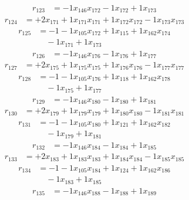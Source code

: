 \[\begin{aligned}
r_{123} &= - 1 x_{146} x_{172} - 1 x_{172} + 1 x_{173}
\end{aligned}\]
\[\begin{aligned}
r_{124} &= + 2 x_{171} + 1 x_{171} x_{171} + 1 x_{172} x_{172} - 1 x_{173} x_{173}
\end{aligned}\]
\[\begin{aligned}
r_{125} &= - 1 - 1 x_{105} x_{172} + 1 x_{115} + 1 x_{162} x_{174} \\
 &\quad - 1 x_{171} + 1 x_{173}
\end{aligned}\]
\[\begin{aligned}
r_{126} &= - 1 x_{146} x_{176} - 1 x_{176} + 1 x_{177}
\end{aligned}\]
\[\begin{aligned}
r_{127} &= + 2 x_{175} + 1 x_{175} x_{175} + 1 x_{176} x_{176} - 1 x_{177} x_{177}
\end{aligned}\]
\[\begin{aligned}
r_{128} &= - 1 - 1 x_{105} x_{176} + 1 x_{118} + 1 x_{162} x_{178} \\
 &\quad - 1 x_{175} + 1 x_{177}
\end{aligned}\]
\[\begin{aligned}
r_{129} &= - 1 x_{146} x_{180} - 1 x_{180} + 1 x_{181}
\end{aligned}\]
\[\begin{aligned}
r_{130} &= + 2 x_{179} + 1 x_{179} x_{179} + 1 x_{180} x_{180} - 1 x_{181} x_{181}
\end{aligned}\]
\[\begin{aligned}
r_{131} &= - 1 - 1 x_{105} x_{180} + 1 x_{121} + 1 x_{162} x_{182} \\
 &\quad - 1 x_{179} + 1 x_{181}
\end{aligned}\]
\[\begin{aligned}
r_{132} &= - 1 x_{146} x_{184} - 1 x_{184} + 1 x_{185}
\end{aligned}\]
\[\begin{aligned}
r_{133} &= + 2 x_{183} + 1 x_{183} x_{183} + 1 x_{184} x_{184} - 1 x_{185} x_{185}
\end{aligned}\]
\[\begin{aligned}
r_{134} &= - 1 - 1 x_{105} x_{184} + 1 x_{124} + 1 x_{162} x_{186} \\
 &\quad - 1 x_{183} + 1 x_{185}
\end{aligned}\]
\[\begin{aligned}
r_{135} &= - 1 x_{146} x_{188} - 1 x_{188} + 1 x_{189}
\end{aligned}\]
